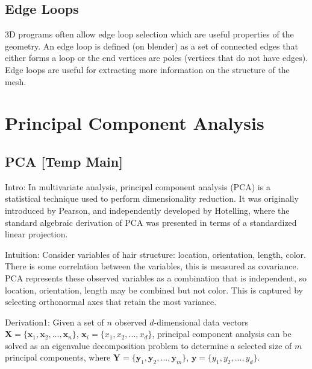 \documentclass[ %
                    author={Dillon Keith Diep},
                supervisor={Dr. Carl Henrik Ek},
                    degree={MEng},
                     title={Assisted Content Generation for 3D Hair Geometry},
                  subtitle={[INCOMPLETE DRAFT, CONTAINS NOTES FROM RESEARCH]},
                      type={Research},
                      year={2014} ]{dissertation}
\begin{document}
\subsection{Edge Loops}
3D programs often allow edge loop selection which are useful properties of the geometry. An edge loop is defined (on blender) as a set of connected edges that either forms a loop or the end vertices are poles (vertices that do not have edges). Edge loops are useful for extracting more information on the structure of the mesh.
\cite{edgeloops}

\section{Principal Component Analysis}
\subsection{PCA [Temp Main]}
Intro:
In multivariate analysis, principal component analysis (PCA) is a statistical technique used to perform dimensionality reduction.\cite{pca2002} It was originally introduced by Pearson\cite{pca1901}, and independently developed by Hotelling\cite{pca1933}, where the standard algebraic derivation of PCA was presented in terms of a standardized linear projection.

Intuition:
Consider variables of hair structure: location, orientation, length, color. There is some correlation between the variables, this is measured as covariance. PCA represents these observed variables as a combination that is independent, so location, orientation, length may be combined but not color. This is captured by selecting orthonormal axes that retain the most variance.

Derivation1:
Given a set of $n$ observed $d$-dimensional data vectors $\mathbf{X}=\{\mathbf{x}_1,\mathbf{x}_2,...,\mathbf{x}_n\}$, $\mathbf{x}_i = \{x_1,x_2,...,x_d\}$, principal component analysis can be solved as an eigenvalue decomposition problem to determine a selected size of $m$ principal components, where $\mathbf{Y}=\{\mathbf{y}_1,\mathbf{y}_2,...,\mathbf{y}_m\}$, $\mathbf{y}=\{y_1,y_2,...,y_d\}$. 
\end{document}
